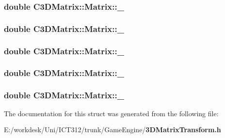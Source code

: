 \subsubsection[{\+\_\+34}]{\setlength{\rightskip}{0pt plus 5cm}double C3\+D\+Matrix\+::\+Matrix\+::\+\_}\label{struct_c3_d_matrix_1_1_matrix_a59cb0429b3ecbd016831f0590d4c88ae}
\subsubsection[{\+\_\+41}]{\setlength{\rightskip}{0pt plus 5cm}double C3\+D\+Matrix\+::\+Matrix\+::\+\_}\label{struct_c3_d_matrix_1_1_matrix_a2c6eef01ba240be4a9ad582e776664ad}
\subsubsection[{\+\_\+42}]{\setlength{\rightskip}{0pt plus 5cm}double C3\+D\+Matrix\+::\+Matrix\+::\+\_}\label{struct_c3_d_matrix_1_1_matrix_ab726befc0889eb8c495d761f282b9a9c}
\subsubsection[{\+\_\+43}]{\setlength{\rightskip}{0pt plus 5cm}double C3\+D\+Matrix\+::\+Matrix\+::\+\_}\label{struct_c3_d_matrix_1_1_matrix_ae518766f74c2d61e34cf719500170cc0}
\subsubsection[{\+\_\+44}]{\setlength{\rightskip}{0pt plus 5cm}double C3\+D\+Matrix\+::\+Matrix\+::\+\_}\label{struct_c3_d_matrix_1_1_matrix_a114a57205f6c4b112cbf4096ccce5456}


The documentation for this struct was generated from the following file\+:\begin{DoxyCompactItemize}
\item 
E\+:/workdesk/\+Uni/\+I\+C\+T312/trunk/\+Game\+Engine/{\bf 3\+D\+Matrix\+Transform.\+h}\end{DoxyCompactItemize}
